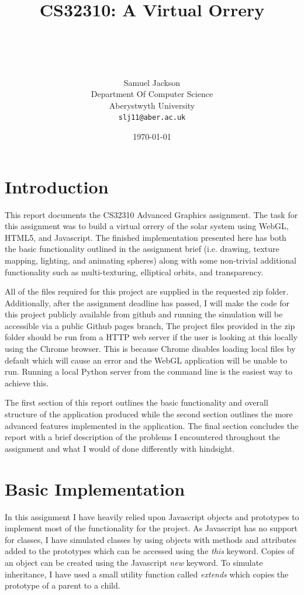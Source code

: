 \documentclass[paper=a4, fontsize=11pt]{scrartcl}	%
\title{ \vspace{-1in} 	\usefont{OT1}{bch}{b}{n}
		\huge \strut CS32310: A Virtual Orrery\strut \\
}
\author{ 									\usefont{OT1}{bch}{m}{n}
        Samuel Jackson\\		\usefont{OT1}{bch}{m}{n}
		Department Of Computer Science\\	\usefont{OT1}{bch}{m}{n}
        Aberystwyth University\\
        \texttt{slj11@aber.ac.uk}
}
\date{\today}
\numberwithin{equation}{section}															%
\numberwithin{figure}{section}																%
\numberwithin{table}{section}																%
\begin{document}
\maketitle

\section{Introduction}
This report documents the CS32310 Advanced Graphics assignment. The task for this assignment was to build a virtual orrery of the solar system using WebGL, HTML5, and Javascript. The finished implementation presented here has both the basic functionality outlined in the assignment brief (i.e. drawing, texture mapping, lighting, and animating spheres) along with some non-trivial additional functionality such as multi-texturing, elliptical orbits, and transparency. 

All of the files required for this project are supplied in the requested zip folder. Additionally, after the assignment deadline has passed, I will make the code for this project publicly available from github \cite{github} and running the simulation will be accessible via a public Github pages branch, The project files provided in the zip folder should be run from a HTTP web server if the user is looking at this locally using the Chrome browser. This is because Chrome disables loading local files by default which will cause an error and the WebGL application will be unable to run. Running a local Python server from the command line is the easiest way to achieve this.

The first section of this report outlines the basic functionality and overall structure of the application produced while the second section outlines the more advanced features implemented in the application. The final section concludes the report with a brief description of the problems I encountered throughout the assignment and what I would of done differently with hindsight.

\section{Basic Implementation}
In this assignment I have heavily relied upon Javascript objects and prototypes to implement most of the functionality for the project. As Javascript has no support for classes, I have simulated classes by using objects with methods and attributes added to the prototypes which can be accessed using the \textit{this} keyword. Copies of an object can be created using the Javascript \textit{new} keyword. To simulate inheritance, I have used a small utility function called \textit{extends} which copies the prototype of a parent to a child.
\end{document}

